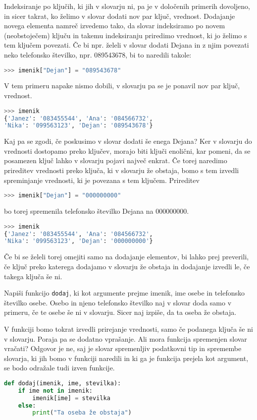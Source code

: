 Indeksiranje po ključih, ki jih v slovarju ni, pa je v določenih primerih dovoljeno, in sicer takrat, ko želimo v slovar dodati nov par ključ, vrednost. Dodajanje novega elementa namreč izvedemo tako, da slovar indeksiramo po novem (neobstoječem) ključu in takemu indeksiranju priredimo vrednost, ki jo želimo s tem ključem povezati. Če bi npr. želeli v slovar dodati Dejana in z njim povezati neko telefonsko številko, npr. 089543678, bi to naredili takole:
\begin{lstlisting}[language=Python]
>>> imenik["Dejan"] = "089543678"
\end{lstlisting}
V tem primeru napake nismo dobili, v slovarju pa se je ponavil nov par ključ, vrednost.
\begin{lstlisting}[language=Python]
>>> imenik
{'Janez': '083455544', 'Ana': '084566732', 
'Nika': '099563123', 'Dejan': '089543678'}
\end{lstlisting}

Kaj pa se zgodi, če poskusimo v slovar dodati še enega Dejana? Ker v slovarju do vrednosti dostopamo preko ključev, morajo biti ključi enolični, kar pomeni, da se posamezen ključ lahko v slovarju pojavi največ enkrat. Če torej naredimo prireditev vrednosti preko ključa, ki v slovarju že obstaja, bomo s tem izvedli spreminjanje vrednosti, ki je povezana s tem ključem. Prireditev
\begin{lstlisting}[language=Python]
>>> imenik["Dejan"] = "000000000"
\end{lstlisting}
bo torej spremenila telefonsko številko Dejana na 000000000.
\begin{lstlisting}[language=Python]
>>> imenik
{'Janez': '083455544', 'Ana': '084566732', 
'Nika': '099563123', 'Dejan': '000000000'}
\end{lstlisting}

Če bi se želeli torej omejiti samo na dodajanje elementov, bi lahko prej preverili, če ključ preko katerega dodajamo v slovarju že obstaja in dodajanje izvedli le, če takega ključa še ni.
\begin{zgled}
Napiši funkcijo \texttt{dodaj}, ki kot argumente prejme imenik, ime osebe in telefonsko številko osebe. Osebo in njeno telefonsko številko naj v slovar doda samo v primeru, če te osebe še ni v slovarju. Sicer naj izpiše, da ta oseba že obstaja.
\end{zgled}
\begin{resitev}
V funkciji bomo tokrat izvedli prirejanje vrednosti, samo če podanega ključa še ni v slovarju. Poraja pa se dodatno vprašanje. Ali mora funkcija spremenjen slovar vračati? Odgovor je ne, saj je slovar spremenljiv podatkovni tip in spremembe slovarja, ki jih bomo v funkciji naredili in ki ga je funkcija prejela kot argument, se bodo odražale tudi izven funkcije.
\begin{lstlisting}[language=Python]
def dodaj(imenik, ime, stevilka):
    if ime not in imenik:
        imenik[ime] = stevilka
    else:
        print("Ta oseba že obstaja")
\end{lstlisting}
\end{resitev}

